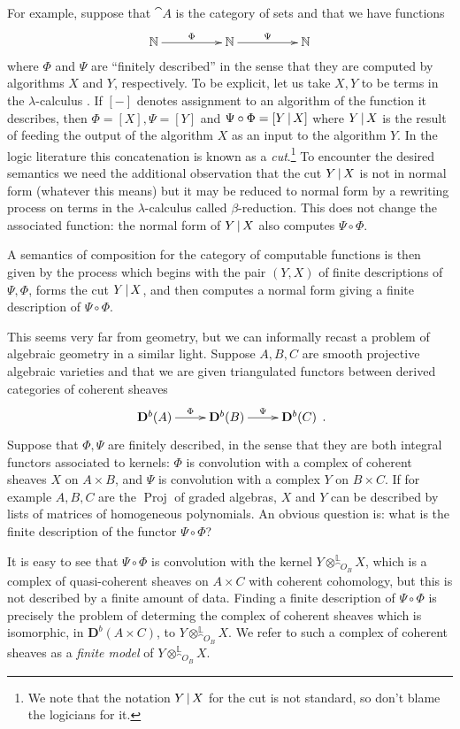\documentclass[english,letter paper,12pt,leqno]{article}
\theoremstyle{example}
\numberwithin{equation}{section}
\begin{document}
For example, suppose that $\cat{A}$ is the category of sets and that we have functions
\[
\xymatrix@C+2pc{
\mathbb{N} \ar[r]^-{\Phi} & \mathbb{N} \ar[r]^-{\Psi} & \mathbb{N}
}
\]
where $\Phi$ and $\Psi$ are ``finitely described'' in the sense that they are computed by algorithms $X$ and $Y$, respectively. To be explicit, let us take $X,Y$ to be terms in the $\lambda$-calculus \cite{selinger}. If $[-]$ denotes assignment to an algorithm of the function it describes, then $\Phi = [X], \Psi = [Y]$ and $\Psi \circ \Phi = [Y \,|\, X]$ where $Y \,|\, X$ is the result of feeding the output of the algorithm $X$ as an input to the algorithm $Y$. In the logic literature this concatenation is known as a \emph{cut}.\footnote{We note that the notation $Y \,|\, X$ for the cut is not standard, so don't blame the logicians for it.} To encounter the desired semantics we need the additional observation that the cut $Y \,|\, X$ is not in normal form (whatever this means) but it may be reduced to normal form by a rewriting process on terms in the $\lambda$-calculus called $\beta$-reduction. This does not change the associated function: the normal form of $Y \,|\, X$ also computes $\Psi \circ \Phi$. 

A semantics of composition for the category of computable functions is then given by the process which begins with the pair $(Y,X)$ of finite descriptions of $\Psi,\Phi$, forms the cut $Y \,|\, X$, and then computes a normal form giving a finite description of $\Psi \circ \Phi$.

\medskip

This seems very far from geometry, but we can informally recast a problem of algebraic geometry in a similar light. Suppose $A,B,C$ are smooth projective algebraic varieties and that we are given triangulated functors between derived categories of coherent sheaves
\[
\xymatrix{
\mathbf{D}^b(A) \ar[r]^-{\Phi} & \mathbf{D}^b(B) \ar[r]^-{\Psi} & \mathbf{D}^b(C)
}\,.
\]
Suppose that $\Phi,\Psi$ are finitely described, in the sense that they are both integral functors associated to kernels: $\Phi$ is convolution with a complex of coherent sheaves $X$ on $A \times B$, and $\Psi$ is convolution with a complex $Y$ on $B \times C$. If for example $A,B,C$ are the $\operatorname{Proj}$ of graded algebras, $X$ and $Y$ can be described by lists of matrices of homogeneous polynomials. An obvious question is: what is the finite description of the functor $\Psi \circ \Phi$?

It is easy to see that $\Psi \circ \Phi$ is convolution with the kernel $Y \otimes^{\mathbb{L}}_{\cat{O}_B} X$, which is a complex of quasi-coherent sheaves on $A \times C$ with coherent cohomology, but this is not described by a finite amount of data. Finding a finite description of $\Psi \circ \Phi$ is precisely the problem of determing the complex of coherent sheaves which is isomorphic, in $\mathbf{D}^b(A \times C)$, to $Y \otimes^{\mathbb{L}}_{\cat{O}_B} X$. We refer to such a complex of coherent sheaves as a \emph{finite model} of $Y \otimes^{\mathbb{L}}_{\cat{O}_B} X$.
\end{document}

